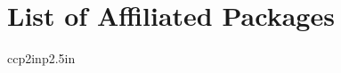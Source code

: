 \documentclass[modern]{aastex631}
\begin{document}
\section{List of Affiliated Packages}

\begin{longrotatetable}
    \begin{deluxetable*}{ccp{2in}p{2.5in}}
    \label{tab:affiliated-registry}
      \startdata
        
      \enddata
  \end{deluxetable*}
\end{longrotatetable}
\end{document}
